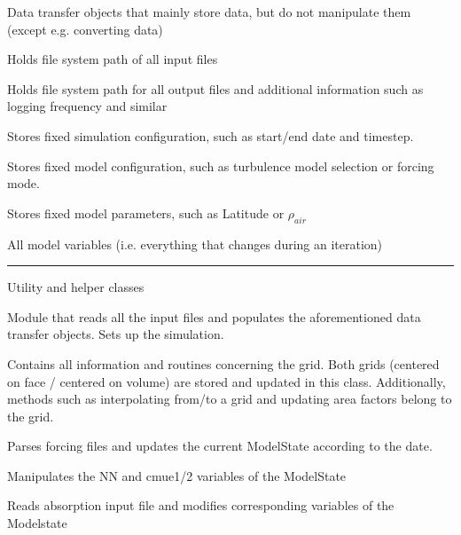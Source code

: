 \documentclass[paper=a4, fontsize=12pt]{article}
\begin{document}
\begin{description}[style=nextline]
 	\item[DTOs] \noindent Data transfer objects that mainly store data, but do not manipulate them (except e.g. converting data)
 \begin{description}[style=multiline, leftmargin=17em]
		\item[InputConfig] Holds file system path of all input files
		
		\item[OutputConfig] Holds file system path for all output files and additional information such as logging frequency and similar
		
		\item[SimConfig] Stores fixed simulation configuration, such as start/end date and timestep. 

		\item[ModelConfig] Stores fixed model configuration, such as turbulence model selection or forcing mode.
		
		\item[ModelParam] Stores fixed model parameters, such as Latitude or $\rho_{air}$
		
		\item[ModelState] All model variables (i.e. everything that changes during an iteration)
\end{description}

 \hrule
\item[Special classes] \noindent Utility and helper classes  
 \begin{description}[style=multiline, leftmargin=17em]
		\item[Inputfile] Module that reads all the input files and populates the aforementioned data transfer objects. Sets up the simulation.
		
		\item[Grid] Contains all information and routines concerning the grid. Both grids (centered on face / centered on volume) are stored and updated in this class. Additionally, methods such as interpolating from/to a grid and updating area factors belong to the grid.
		
		\item[Forcing] Parses forcing files and updates the current ModelState according to the date.

		\item[Stability] Manipulates the NN and cmue1/2 variables of the ModelState
\end{description}

		\item[Absorption] Reads absorption input file and modifies corresponding variables of the Modelstate
		

\end{description}
\end{document}
